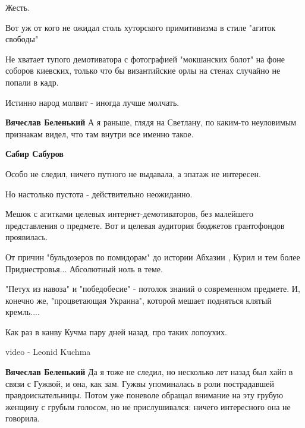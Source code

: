 \begin{itemize}
Жесть.

Вот уж от кого не ожидал столь хуторского примитивизма в стиле "агиток свободы"

Не хватает тупого демотиватора с фотографией "мокшанских болот" на фоне соборов
киевских, только что бы византийские орлы на стенах случайно не попали в кадр.

Истинно народ молвит - иногда лучше молчать.

\begin{itemize}
 
\textbf{Вячеслав Беленький} А я раньше, глядя на Светлану, по каким-то неуловимым признакам видел, что там внутри все именно такое.

 
\textbf{Сабир Сабуров}

Особо не следил, ничего путного не выдавала, а эпатаж не интересен.

Но настолько пустота - действительно неожиданно.

Мешок с агитками целевых интернет-демотиваторов, без малейшего представления о
предмете. Вот и целевая аудитория бюджетов грантофондов проявилась.

От причин "бульдозеров по помидорам" до истории Абхазии , Курил и тем более
Приднестровья... Абсолютный ноль в теме.

"Петух из навоза" и "победобесие" - потолок знаний о современном предмете. И,
конечно же, "процветающая Украина", которой мешает подняться клятый кремль....

Как раз в канву Кучма пару дней назад, про таких лопоухих.

video - Leonid Kuchma

 
\textbf{Вячеслав Беленький} Да я тоже не следил, но несколько лет назад был хайп в связи с Гужвой, и она, как зам. Гужвы упоминалась в роли пострадавшей правдоискательницы. Потом уже поневоле обращал внимание на эту грубую женщину с грубым голосом, но не прислушивался: ничего интересного она не говорила.


\end{itemize}
\end{itemize}
